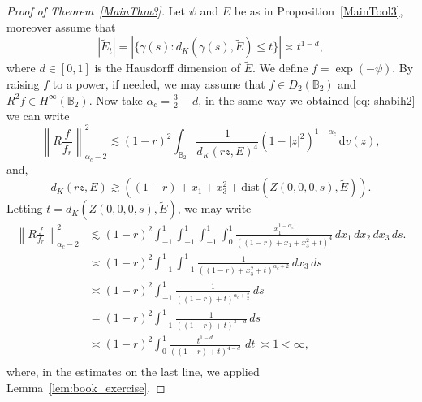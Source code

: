 \documentclass[a4paper,12pt]{amsart}
\theoremstyle{definition}
\theoremstyle{remark}
\def\B{\mathbb{B}}
\begin{document}
    \begin{proof} [Proof of Theorem~\ref{MainThm3}]
        Let $\psi$ and $E$ be as in Proposition~\ref{MainTool3}, moreover assume that
        \begin{equation*}
            |\tilde{E}_t| = \left| \{ \gamma(s): d_K(\gamma(s),\tilde{E}) \leq t \} \right| \asymp t^{1-d},
        \end{equation*}
        where $d \in [0,1]$ is the Hausdorff dimension of $\tilde{E}$. We define $f = \exp{(-\psi)}$. By raising $f$ to a power, if needed, we may assume that $f \in D_2(\B_2)$ and $R^2 f \in H^{\infty}(\B_2)$. Now take $\alpha_c = \frac{3}{2} - d$, in the same way we obtained \eqref{eq: shabih2} we can write
        \begin{equation}
            \left\| R \frac{f}{f_r} \right\|_{\alpha_c - 2}^2 \lesssim (1-r)^2 \int_{\B_2}  \frac{1}{d_K(rz,E)^4}  (1-|z|^2)^{1-\alpha_c}\, \mathrm{d}v(z),
        \end{equation}
        and, 
        \begin{equation}
            d_K(rz,E) \gtrsim  \left( (1-r) + x_1 + x_3^2 + \mathrm{dist}(Z(0,0,0,s),\tilde{E}) \right).
        \end{equation}
        Letting $t = d_K(Z(0,0,0,s),\tilde{E})$, we may write
    \begin{equation}
        \begin{aligned}
        \left\| R \frac{f}{f_r} \right\|^2_{\alpha_c - 2}
        &\lesssim (1 - r)^2 \int_{-1}^1 \int_{-1}^1 \int_{-1}^1 \int_0^1 
        \frac{x_1^{1 - \alpha_c}}{((1-r) + x_1 + x_3^2 + t)^{4}} \, dx_1\, dx_2\, dx_3\, ds.\\ 
    &\asymp (1 - r)^2 \int_{-1}^1 \int_{-1}^1 
    \frac{1}{((1 - r) + x_3^2 + t)^{\alpha_c + 2}} \, dx_3\, ds \\
    &\asymp (1 - r)^2  \int_{-1}^1
    \frac{1}{((1 - r) + t)^{\alpha_c + \frac{3}{2}}} \, ds \\
    &= (1 - r)^2 \int_{-1}^1
    \frac{1}{((1 - r) + t)^{3-d}} \, ds \\
    & \asymp (1 - r)^2 \int_0^{1} \frac{t^{1-d}}{((1 - r) + t)^{4-d}}\, \, dt\ \asymp 1 < \infty, \\
    \end{aligned}
    \end{equation}
    where, in the estimates on the last line, we applied Lemma~\ref{lem:book_exercise}.
    

\end{proof}
\end{document}
